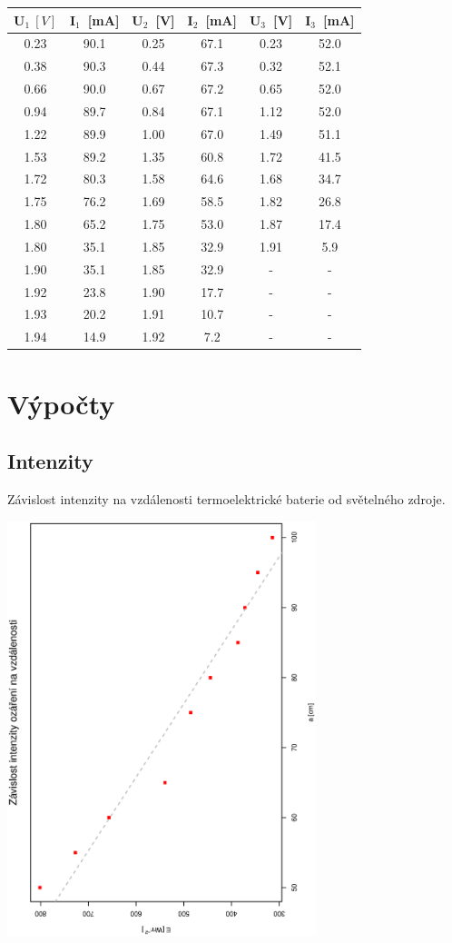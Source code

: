 \documentclass[10pt]{article}
\begin{document}
\begin{scriptsize}
\begin{minipage}[t]{.5\textwidth}
\begin{tabular}[b]{|c|c|c|c|c|c|}
\hline
U$_1~[V]$ & I$_1$~[mA] & U$_2$~[V] & I$_2$~[mA] & U$_3$~[V] & I$_3$~[mA] \\
\hline
0.23 & 90.1 & 0.25 & 67.1 & 0.23 & 52.0 \\
0.38 & 90.3 & 0.44 & 67.3 & 0.32 & 52.1 \\
0.66 & 90.0 & 0.67 & 67.2 & 0.65 & 52.0 \\
0.94 & 89.7 & 0.84 & 67.1 & 1.12 & 52.0 \\
1.22 & 89.9 & 1.00 & 67.0 & 1.49 & 51.1 \\
1.53 & 89.2 & 1.35 & 60.8 & 1.72 & 41.5 \\
1.72 & 80.3 & 1.58 & 64.6 & 1.68 & 34.7 \\
1.75 & 76.2 & 1.69 & 58.5 & 1.82 & 26.8 \\
1.80 & 65.2 & 1.75 & 53.0 & 1.87 & 17.4 \\
1.80 & 35.1 & 1.85 & 32.9 & 1.91 & 5.9 \\
1.90 & 35.1 & 1.85 & 32.9 & - & - \\
1.92 & 23.8 & 1.90 & 17.7 & - & - \\
1.93 & 20.2 & 1.91 & 10.7 & - & - \\
1.94 & 14.9 & 1.92 & 7.2 & - & - \\
\hline
\end{tabular}
\end{minipage}
\end{scriptsize}

\section{Výpočty}
\subsection{Intenzity}
Závislost intenzity na vzdálenosti termoelektrické baterie od světelného zdroje.
\begin{center}
\includegraphics[width=9cm,angle=270]{graf0.eps} \\[1cm]
\end{center}
\end{document}
